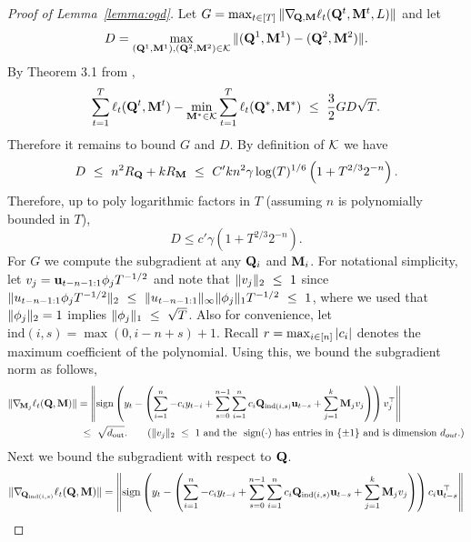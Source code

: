 \begin{proof}[Proof of Lemma~\ref{lemma:ogd}]
Let $G = \max_{t \in [T]} \norm{\nabla_{\Q,\M} \ell_t(\Q^t, \M^t, L)}$ and let $$D = \max_{(\mathbf{Q}^1, \mathbf{M}^1), (\mathbf{Q}^2, \mathbf{M}^2) \in \mathcal{K}} \|(\mathbf{Q}^1, \mathbf{M}^1) - (\mathbf{Q}^2, \mathbf{M}^2)\|.$$ By Theorem 3.1 from \cite{hazan2016introduction}, 
    \begin{equation*}
        \sum_{t = 1}^T \ell_t(\mathbf{Q}^t, \mathbf{M}^t) -  \min_{\mathbf{M}^* \in \mathcal{K}}  \sum_{t = 1}^T \ell_t(\mathbf{Q}^*, \mathbf{M}^*) ~\le~ \frac{3}{2} GD \sqrt{T}.
    \end{equation*}
    Therefore it remains to bound $G$ and $D$. By definition of $\mathcal{K}$ we have
    \begin{equation*}
        D ~\le~ n^2 R_{\mathbf{Q}} + k R_{\mathbf{M}} ~\le~ C' k n^2 \gamma \log(T)^{1/6} \left( 1 + T^{2/3}2^{-n}\right).
    \end{equation*}
    Therefore, up to poly logarithmic factors in $T$ (assuming $n$ is polynomially bounded in $T$),
     \begin{equation*}
        D \leq c' \gamma \left( 1 + T^{2/3}2^{-n}\right).
    \end{equation*}
    For $G$ we compute the subgradient at any $\mathbf{Q}_i$ and $\mathbf{M}_i$. 
    For notational simplicity, let $v_j = \mathbf u_{t-n-1:1} \phi_j T^{-1/2}$ and note that $\|v_j\|_2 ~\le~ 1$ since $\|u_{t-n-1:1} \phi_j T^{-1/2}\|_2 ~\le~ \|u_{t-n-1:1}\|_{\infty} \|\phi_j\|_1 T^{-1/2} ~\le~ 1$, where we used that $\|\phi_j\|_2 = 1$ implies $\|\phi_j\|_1 ~\le~ \sqrt{T}$. Also for convenience, let $\mathrm{ind}(i,s) = \max(0, i-n+s) + 1$. Recall $r = \max_{i \in [n]} |c_i|$ denotes the maximum coefficient of the polynomial. Using this, we bound the subgradient norm as follows,
  \begin{align*}
        \norm{ \nabla_{\M_j} \ell_t(\Q,\M) }  
        & = \left\|  \mathrm{sign} \left( y_t - \left(\sum_{i = 1}^n -c_i y_{t-i} + \sum_{s = 0}^{n-1} \sum_{i = 1}^n c_i \Q_{\mathrm{ind}(i,s)} \uv_{t-s} + \sum_{j = 1}^k \M_j v_j \right)  \right)  v_j^{\top} \right\| \\
            & \leq   \sqrt{d_{\textrm{out}}}. \tag{$\norm{v_j}_2 \leq 1$ and the $\sign(\cdot)$ has entries in $\{ \pm 1 \}$ and is dimension $d_{out}$.}
    \end{align*}
    Next we bound the subgradient with respect to $\mathbf{Q}$. 
    \begin{align*}
        \norm{ \nabla_{\Q_{\mathrm{ind}(i,s)}} \ell_t(\Q,\M) }  
        & = \left\|  \mathrm{sign}  \left( y_t - \left(\sum_{i = 1}^n -c_i y_{t-i} + \sum_{s = 0}^{n-1} \sum_{i = 1}^n c_i \Q_{\mathrm{ind}(i,s)} \uv_{t-s} + \sum_{j = 1}^k \M_j v_j \right)  \right)  c_i \uv_{t-s}^{\top} \right\| \\

\end{align*}
\end{proof}
